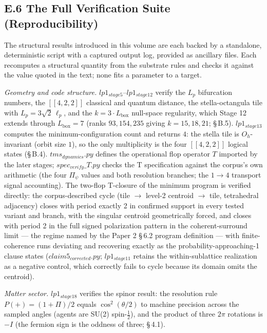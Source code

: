 \documentclass[11pt,oneside]{report}
\theoremstyle{definition}
\theoremstyle{remark}
\begin{document}
\subsection*{E.6 The Full Verification Suite (Reproducibility)}

The structural results introduced in this volume are each backed by a
standalone, deterministic script with a captured output log, provided as
ancillary files. Each recomputes a structural quantity from the substrate
rules and checks it against the value quoted in the text; none fits a
parameter to a target.

\emph{Geometry and code structure.} \ensuremath{lp1_{stage5}}--\ensuremath{lp1_{stage12}} verify the
\ensuremath{L_p} bifurcation numbers, the \ensuremath{[[4,2,2]]} classical and quantum distance,
the stella-octangula tile with \ensuremath{L_p = 3\sqrt{2}\,\ell_p}, and the
\ensuremath{k = 3\cdot L_{\mathrm{box}}} null-space regularity, which Stage 12 extends through
\ensuremath{L_{\mathrm{box}} = 7} (ranks \ensuremath{93, 154, 235} giving \ensuremath{k = 15, 18, 21}; \S\,B.5).
\ensuremath{lp1_{stage13}} computes the minimum-configuration count and returns \ensuremath{4}: the
stella tile is \ensuremath{O_{h}}-invariant (orbit size \ensuremath{1}), so the only multiplicity is
the four \ensuremath{[[4,2,2]]} logical states (\S\,B.4). \ensuremath{tms_{dynamics}.py} defines the
operational flop operator \ensuremath{T} imported by the later stages;
\ensuremath{spec_{verify}\_T.py} checks the T specification against the corpus's own
arithmetic (the four \ensuremath{\Pi_{\psi}} values and both resolution branches; the
\ensuremath{1\to 4} transport signal accounting). The two-flop T-closure of the minimum
program is verified directly: the corpus-described cycle (tile \ensuremath{\to} level-2
centroid \ensuremath{\to} tile, tetrahedral adjacency) closes with period exactly 2 in
confirmed support in every tested variant and branch, with the singular
centroid geometrically forced, and closes with period 2 in the full signed
polarization pattern in the coherent-surround limit --- the regime named by
the Paper 2 \S\,6.2 program definition --- with finite-coherence runs
deviating and recovering exactly as the probability-approaching-1 clause
states (\ensuremath{claim5_{corrected}.py}; \ensuremath{lp1_{stage11}} retains the
within-sublattice realization as a negative control, which correctly fails
to cycle because its domain omits the centroid).

\emph{Matter sector.} \ensuremath{lp1_{stage18}} verifies the spinor result: the
resolution rule \ensuremath{P(+) = (1+\Pi)/2} equals \ensuremath{\cos^2(\theta/2)} to machine
precision across the sampled angles (agents are SU(2) spin-\ensuremath{\tfrac{1}{2}}), and the
product of three \ensuremath{2\pi} rotations is \ensuremath{-I} (the fermion sign is the oddness of
three; \S\,4.1).
\end{document}
